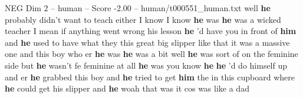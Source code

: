 \begin{textsample}{NEG Dim 2 – human – Score -2.00 – human/t000551\_human.txt}  \label{ex:f2_neg_009}
well \textbf{he} probably didn't want to teach either I know I know \textbf{he} was \textbf{he} was a wicked teacher I mean if anything went wrong his lesson \textbf{he} 'd have you in front of \textbf{him} and \textbf{he} used to have what they this great big slipper like that it was a massive one and this boy who er \textbf{he} was \textbf{he} was a bit well \textbf{he} was sort of on the feminine side but \textbf{he} wasn't fe feminine at all \textbf{he} was you know \textbf{he} \textbf{he} 'd do himself up and er \textbf{he} grabbed this boy and \textbf{he} tried to get \textbf{him} the in this cupboard where \textbf{he} could get his slipper and \textbf{he} woah that was it cos was like a dad

\end{textsample}

